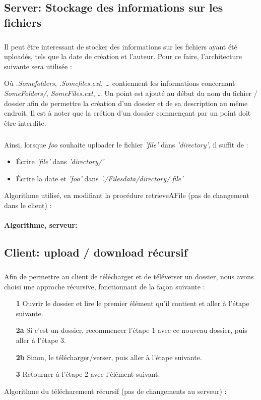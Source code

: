 \documentclass[12pt,a4paper,twoside]{article}
\begin{document}
		\subsection{Server: Stockage des informations sur les fichiers} %
			\subparagraph*{}
				Il peut être interessant de stocker des informations sur les fichiers ayant été uploadés, tels que la date de création et l'auteur.
				Pour ce faire, l'architecture suivante sera utilisée :
				\begin{samepage}
					
				\end{samepage}
				Où \textit{.Somefolders}, \textit{.Somefiles.ext}, \ldots{} contiennent les informations concernant \textit{SomeFolders/}, \textit{SomeFiles.ext}, \ldots{}
				Un point est ajouté au début du nom du fichier / dossier afin de permettre la création d'un dossier et de sa description au même endroit. Il est à noter que la crétion d'un dossier commençant par un point doit être interdite.
			\subparagraph*{}
				Ainsi, lorsque \textit{foo} souhaite uploader le fichier \textit{'file'} dans \textit{'directory'}, il suffit de :
				\begin{itemize}
					\item{} Écrire \textit{'file'} dans \textit{'directory/'}
					\item{} Écrire la date et \textit{'foo'} dans \textit{'./Filesdata/directory/.file'}
				\end{itemize}
				Algorithme utilisé, en modifiant la procédure retrieveAFile (pas de changement dans le client) :
			\paragraph*{Algorithme, serveur:}
				
				
		\subsection{Client: upload / download récursif} %
			\subparagraph*{}
				Afin de permettre au client de télécharger et de téléverser un dossier, nous avons choisi une approche récursive, fonctionnant de la façon suivante :
				\begin{itemize}
					\item[\textbf{1 }]{} Ouvrir le dossier et lire le premier élément qu'il contient et aller à l'étape suivante.
					\item[\textbf{2a}]{} Si c'est un dossier, recommencer l'étape 1 avec ce nouveau dossier, puis aller à l'étape 3.
					\item[\textbf{2b}]{} Sinon, le télécharger/verser, puis aller à l'étape suivante.
					\item[\textbf{3 }]{} Retourner à l'étape 2 avec l'élément suivant.
				\end{itemize}
				Algorithme du télécharement récursif (pas de changements au serveur) :
\end{document}
